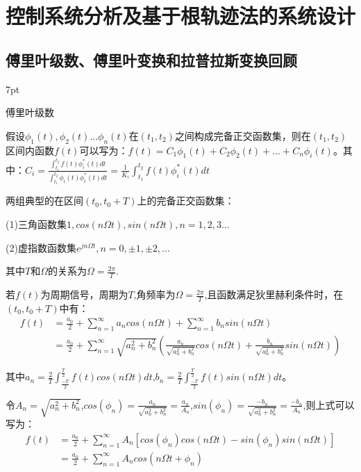 \documentclass{article}
\numberwithin{equation}{section}
\numberwithin{figure}{section}
\newenvironment{formal}{%
\def\FrameCommand{%
\hspace{1pt}%
{\color{DarkBlue}\vrule width 2pt}%
{\color{formalshade}\vrule width 4pt}%
\colorbox{formalshade}%
}%
\MakeFramed{\advance\hsize-\width\FrameRestore}%
\noindent\hspace{-4.55pt}%
\begin{adjustwidth}{}{7pt}%
\vspace{2pt}\vspace{2pt}%
}
{%
\vspace{2pt}\end{adjustwidth}\endMakeFramed%
}
\begin{document}
\section{控制系统分析及基于根轨迹法的系统设计}
\subsection{傅里叶级数、傅里叶变换和拉普拉斯变换回顾}
\begin{formal}
    傅里叶级数
\end{formal}

假设$\phi_1(t),\phi_2(t)...\phi_n(t)$在$(t_1,t_2)$之间构成完备正交函数集，则在$(t_1,t_2)$区间内函数$f(t)$可以写为：$f(t)=C_1\phi_1(t)+C_2\phi_2(t)+...+C_n\phi_i(t)$。其中：$C_i=\frac{\int_{t_1}^{t_2}f(t)\phi^*_i(t)dt}{\int_{t_1}^{t_2}\phi_i(t)\phi^*_i(t)dt}=\frac{1}{K_i}\int_{t_1}^{t_2}f(t)\phi^*_i(t)dt$

两组典型的在区间$(t_0,t_0+T)$上的完备正交函数集：

(1)三角函数集{$1,cos(n\Omega t),sin(n\Omega t),n=1,2,3...$}

(2)虚指数函数集{$e^{jn\Omega t},n=0,\pm1,\pm2,...$ }

其中$T$和$\Omega$的关系为$\Omega=\frac{2\pi}{T}$.

若$f(t)$为周期信号，周期为$T$,角频率为$\Omega=\frac{2\pi}{T}$,且函数满足狄里赫利条件时，在$(t_0,t_0+T)$中有：
\begin{equation}
    \begin{split}
        f(t)&=\frac{a_0}{2}+\sum_{n = 1}^{\infty} a_ncos(n\Omega t)+ \sum_{n = 1}^{\infty} b_nsin(n\Omega t)\\
        &=\frac{a_0}{2}+\sum_{n = 1}^{\infty}\sqrt{a_n^2+b_n^2}(\frac{a_n}{\sqrt{a_n^2+b_n^2}}cos(n\Omega t)+\frac{b_n}{\sqrt{a_n^2+b_n^2}}sin(n\Omega t))
    \end{split}
\end{equation}

其中$a_n=\frac{2}{T}\int_{\frac{-T}{2}}^{\frac{T}{2}}f(t)cos(n\Omega t)dt$,$b_n=\frac{2}{T}\int_{\frac{-T}{2}}^{\frac{T}{2}}f(t)sin(n\Omega t)dt$。

令$A_n=\sqrt{a_n^2+b_n^2}$,$cos(\phi_n)=\frac{a_n}{\sqrt{a_n^2+b_n^2}}=\frac{a_n}{A_n}$,$sin(\phi_n)=\frac{-b_n}{\sqrt{a_n^2+b_n^2}}=\frac{-b_n}{A_n}$,则上式可以写为：
\begin{equation}
    \begin{split}
        f(t)&=\frac{a_0}{2}+\sum_{n = 1}^{\infty}A_n[cos(\phi_n)cos(n\Omega t)-sin(\phi_n)sin(n\Omega t)]\\
        &=\frac{a_0}{2}+\sum_{n = 1}^{\infty}A_ncos(n\Omega t+\phi_n)
    \end{split}
\end{equation}
\end{document}
